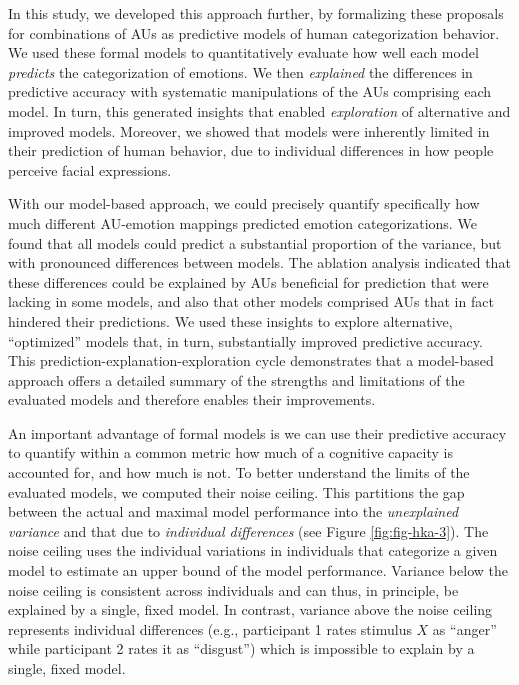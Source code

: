 \documentclass[11pt,american,a4paper,oneside,]{memoir} %
\begin{document}
In this study, we developed this approach further, by formalizing these proposals for combinations of AUs as predictive models of human categorization behavior. We used these formal models to quantitatively evaluate how well each model \emph{predicts} the categorization of emotions. We then \emph{explained} the differences in predictive accuracy with systematic manipulations of the AUs comprising each model. In turn, this generated insights that enabled \emph{exploration} of alternative and improved models. Moreover, we showed that models were inherently limited in their prediction of human behavior, due to individual differences in how people perceive facial expressions.

With our model-based approach, we could precisely quantify specifically how much different AU-emotion mappings predicted emotion categorizations. We found that all models could predict a substantial proportion of the variance, but with pronounced differences between models. The ablation analysis indicated that these differences could be explained by AUs beneficial for prediction that were lacking in some models, and also that other models comprised AUs that in fact hindered their predictions. We used these insights to explore alternative, ``optimized'' models that, in turn, substantially improved predictive accuracy. This prediction-explanation-exploration cycle demonstrates that a model-based approach offers a detailed summary of the strengths and limitations of the evaluated models and therefore enables their improvements.

An important advantage of formal models is we can use their predictive accuracy to quantify within a common metric how much of a cognitive capacity is accounted for, and how much is not. To better understand the limits of the evaluated models, we computed their noise ceiling. This partitions the gap between the actual and maximal model performance into the \emph{unexplained variance} and that due to \emph{individual differences} (see Figure \ref{fig:fig-hka-3}). The noise ceiling uses the individual variations in individuals that categorize a given model to estimate an upper bound of the model performance. Variance below the noise ceiling is consistent across individuals and can thus, in principle, be explained by a single, fixed model. In contrast, variance above the noise ceiling represents individual differences (e.g., participant 1 rates stimulus \(X\) as ``anger'' while participant 2 rates it as ``disgust'') which is impossible to explain by a single, fixed model.
\end{document}
